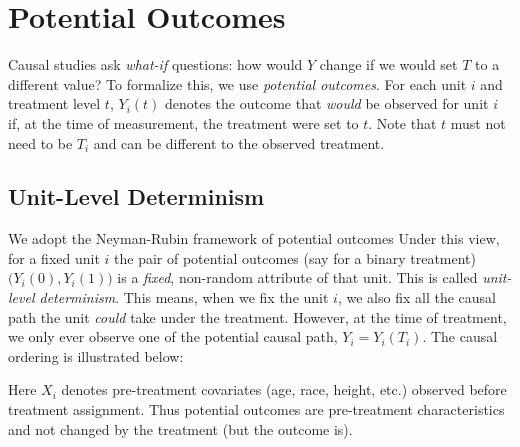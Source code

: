 \documentclass[11pt]{exam}
\theoremstyle{plain}
\begin{document}
\section{Potential Outcomes}
Causal studies ask \emph{what-if} questions: how would $Y$ change if we would set $T$ to a different value?
To formalize this, we use \emph{potential outcomes}. For each unit $i$ and treatment level $t$,
$Y_i(t)$ denotes the outcome that \emph{would} be observed for unit $i$ if, at the time of measurement,
the treatment were set to $t$. Note that $t$ must not need to be $T_i$ and can be different to the observed treatment.

\subsection{Unit-Level Determinism}
We adopt the Neyman-Rubin framework \citep{neyman1923application,rubin1974estimating} of potential outcomes Under this view,
for a fixed unit $i$ the pair of potential outcomes (say for a binary treatment) $\big(Y_i(0),Y_i(1)\big)$ is a \emph{fixed}, non-random attribute of that unit. This is called \emph{unit-level determinism}. This means, when we fix the unit $i$, we also fix all the causal path the unit \emph{could} take under the treatment. However, at the time of treatment, we only ever observe one of the potential causal path, $Y_i = Y_i(T_i)$. The causal ordering is illustrated below:

\begin{center}
\end{center}
Here $X_i$ denotes pre-treatment covariates (age, race, height, etc.) observed before treatment assignment. Thus potential outcomes are pre-treatment characteristics and not changed by the treatment (but the outcome is).
\end{document}
